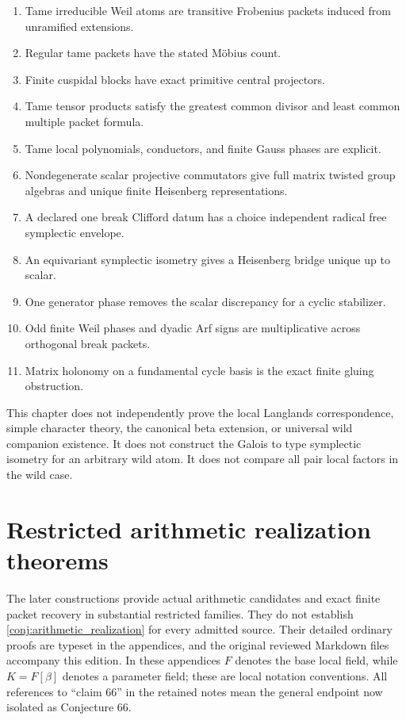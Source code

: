 \documentclass[11pt]{amsart}
\theoremstyle{definition}
\theoremstyle{remark}
\begin{document}
\begin{enumerate}
\item Tame irreducible Weil atoms are transitive Frobenius packets induced from unramified extensions.
\item Regular tame packets have the stated Möbius count.
\item Finite cuspidal blocks have exact primitive central projectors.
\item Tame tensor products satisfy the greatest common divisor and least common multiple packet formula.
\item Tame local polynomials, conductors, and finite Gauss phases are explicit.
\item Nondegenerate scalar projective commutators give full matrix twisted group algebras and unique finite Heisenberg representations.
\item A declared one break Clifford datum has a choice independent radical free symplectic envelope.
\item An equivariant symplectic isometry gives a Heisenberg bridge unique up to scalar.
\item One generator phase removes the scalar discrepancy for a cyclic stabilizer.
\item Odd finite Weil phases and dyadic Arf signs are multiplicative across orthogonal break packets.
\item Matrix holonomy on a fundamental cycle basis is the exact finite gluing obstruction.
\end{enumerate}

This chapter does not independently prove the local Langlands correspondence, simple character theory, the canonical beta extension, or universal wild companion existence. It does not construct the Galois to type symplectic isometry for an arbitrary wild atom. It does not compare all pair local factors in the wild case.

\section{Restricted arithmetic realization theorems}
\label{sec:arithmetic_progress}

The later constructions provide actual arithmetic candidates and exact
finite packet recovery in substantial restricted families. They do not
establish \cref{conj:arithmetic_realization} for every admitted source.
Their detailed ordinary proofs are typeset in the appendices, and the
original reviewed Markdown files accompany this edition. In these
appendices \(F\) denotes the base local field, while \(K=F[\beta]\)
denotes a parameter field; these are local notation conventions.
All references to ``claim 66'' in the retained notes mean the general
endpoint now isolated as Conjecture 66.
\end{document}
